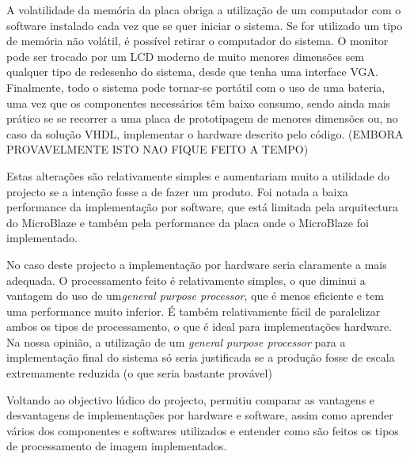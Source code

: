 \documentclass[a4paper]{article}
\begin{document}
A volatilidade da memória da placa obriga a utilização de um computador com o software instalado cada vez que se quer iniciar o sistema. Se for utilizado um tipo de memória não volátil, é possível retirar o computador do sistema. O monitor pode ser trocado por um LCD moderno de muito menores dimensões sem qualquer tipo de redesenho do sistema, desde que tenha uma interface VGA. Finalmente, todo o sistema pode tornar-se portátil com o uso de uma bateria, uma vez que os componentes necessários têm baixo consumo, sendo ainda mais prático se se recorrer a uma placa de prototipagem de menores dimensões ou, no caso da solução VHDL, implementar o hardware descrito pelo código. (EMBORA PROVAVELMENTE ISTO NAO FIQUE FEITO A TEMPO)

Estas alterações são relativamente simples e aumentariam muito a utilidade do projecto se a intenção fosse a de fazer um produto. 
Foi notada a baixa performance da implementação por software, que está limitada pela arquitectura do MicroBlaze e também pela performance da placa onde o MicroBlaze foi implementado. 

No caso deste projecto a implementação por hardware seria claramente a mais adequada. O processamento feito é relativamente simples, o que diminui a vantagem do uso de um\textit{general purpose processor}, que é menos eficiente e tem uma performance muito inferior. É também relativamente fácil de paralelizar ambos os tipos de processamento, o que é ideal para implementações hardware. Na nossa opinião, a utilização de um \textit{general purpose processor} para a implementação final do sistema só seria justificada se a produção fosse de escala extremamente reduzida (o que seria bastante provável)

Voltando ao objectivo lúdico do projecto, permitiu comparar as vantagens e desvantagens de implementações por hardware e software, assim como aprender vários dos componentes e softwares utilizados e entender como são feitos os tipos de processamento de imagem implementados.






\nocite{labsECom}
\end{document}
